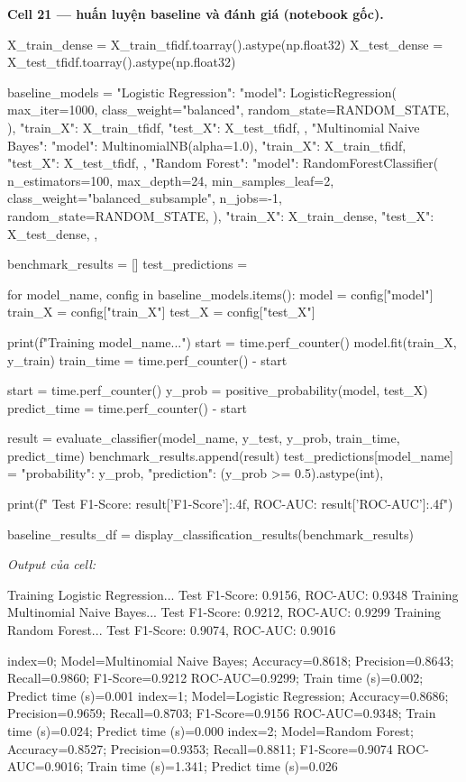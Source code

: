 \documentclass[12pt,a4paper]{report}
\begin{document}
\par\medskip\noindent\textbf{Cell 21 --- huấn luyện baseline và đánh giá (notebook gốc).}
\begin{NotebookCode}
X_train_dense = X_train_tfidf.toarray().astype(np.float32)
X_test_dense = X_test_tfidf.toarray().astype(np.float32)

baseline_models = {
    "Logistic Regression": {
        "model": LogisticRegression(
            max_iter=1000,
            class_weight="balanced",
            random_state=RANDOM_STATE,
        ),
        "train_X": X_train_tfidf,
        "test_X": X_test_tfidf,
    },
    "Multinomial Naive Bayes": {
        "model": MultinomialNB(alpha=1.0),
        "train_X": X_train_tfidf,
        "test_X": X_test_tfidf,
    },
    "Random Forest": {
        "model": RandomForestClassifier(
            n_estimators=100,
            max_depth=24,
            min_samples_leaf=2,
            class_weight="balanced_subsample",
            n_jobs=-1,
            random_state=RANDOM_STATE,
        ),
        "train_X": X_train_dense,
        "test_X": X_test_dense,
    },
}

benchmark_results = []
test_predictions = {}

for model_name, config in baseline_models.items():
    model = config["model"]
    train_X = config["train_X"]
    test_X = config["test_X"]

    print(f"Training {model_name}...")
    start = time.perf_counter()
    model.fit(train_X, y_train)
    train_time = time.perf_counter() - start

    start = time.perf_counter()
    y_prob = positive_probability(model, test_X)
    predict_time = time.perf_counter() - start

    result = evaluate_classifier(model_name, y_test, y_prob, train_time, predict_time)
    benchmark_results.append(result)
    test_predictions[model_name] = {
        "probability": y_prob,
        "prediction": (y_prob >= 0.5).astype(int),
    }

    print(f"  Test F1-Score: {result['F1-Score']:.4f}, ROC-AUC: {result['ROC-AUC']:.4f}")

baseline_results_df = display_classification_results(benchmark_results)
\end{NotebookCode}
\noindent\textit{Output của cell:}
\begin{NotebookOutput}
Training Logistic Regression...
  Test F1-Score: 0.9156, ROC-AUC: 0.9348
Training Multinomial Naive Bayes...
  Test F1-Score: 0.9212, ROC-AUC: 0.9299
Training Random Forest...
  Test F1-Score: 0.9074, ROC-AUC: 0.9016

index=0; Model=Multinomial Naive Bayes; Accuracy=0.8618; Precision=0.8643; Recall=0.9860; F1-Score=0.9212
  ROC-AUC=0.9299; Train time (s)=0.002; Predict time (s)=0.001
index=1; Model=Logistic Regression; Accuracy=0.8686; Precision=0.9659; Recall=0.8703; F1-Score=0.9156
  ROC-AUC=0.9348; Train time (s)=0.024; Predict time (s)=0.000
index=2; Model=Random Forest; Accuracy=0.8527; Precision=0.9353; Recall=0.8811; F1-Score=0.9074
  ROC-AUC=0.9016; Train time (s)=1.341; Predict time (s)=0.026
\end{NotebookOutput}
\end{document}

